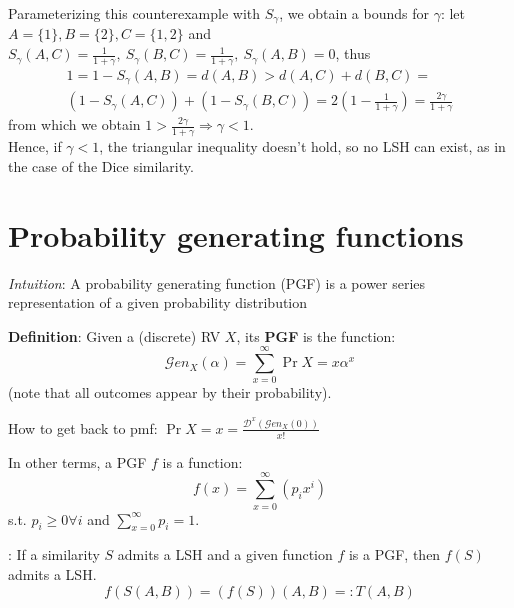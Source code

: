 	\obs Parameterizing this counterexample with $S_\gamma$, we obtain a bounds for $\gamma$: let $A=\{1\}, B=\{2\}, C=\{1, 2\}$ and \\
	$S_\gamma(A,C)=\frac{1}{1+\gamma},\ S_\gamma(B,C)=\frac{1}{1+\gamma},\ S_\gamma(A,B)=0$, thus
	\begin{multline*}
		1=1-S_\gamma(A,B)=d(A,B) > d(A,C) + d(B,C) = \\
		(1-S_\gamma(A,C)) + (1-S_\gamma(B,C)) = 2 \left( 1- \frac{1}{1+\gamma} \right) = \frac{2\gamma}{1 + \gamma}
	\end{multline*}
	from which we obtain
	$1 > \frac{2\gamma}{1 + \gamma} \Rightarrow \gamma < 1$. \\
	Hence, if $\gamma < 1$, the triangular inequality doesn't hold, so no LSH can exist, as in the case of the Dice similarity.
	
\section{Probability generating functions}
	
	\textit{Intuition}: A probability generating function (PGF) is a power series representation of a given probability distribution
	
	\textbf{Definition}: Given a (discrete) RV $X$, its \textbf{PGF} is the function:
	\begin{equation}
		\mathcal{G}en_X(\alpha)= \sum_{x=0}^{\infty}\Pr{X=x}\alpha^x
	\end{equation}
	(note that all outcomes appear by their probability).
	
	How to get back to pmf: $\displaystyle \Pr{X=x} = \frac{\mathcal{D}^x(\mathcal{G}en_X(0))}{x!}$  %
	
	In other terms, a PGF $f$ is a function:
	\begin{equation}
		f(x)= \sum_{x=0}^{\infty}\left( p_i x^i \right)
	\end{equation}
	s.t. $p_i\geq 0 \forall i$ and $\sum_{x=0}^{\infty} p_i = 1$.
	
	\thm: If a similarity $S$ admits a LSH and a given function $f$ is a PGF, then $f(S)$ admits a LSH.
	\begin{equation*}
		f(S(A,B))=(f(S)) (A,B) =: T(A,B)
	\end{equation*}
	
	
